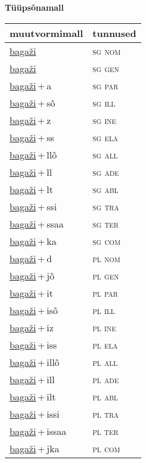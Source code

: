 
\vspace{1.8em}
\begin{minipage}{\textwidth}
\textbf{Tüüpsõnamall \,}\\

\begin{sideways}
\begin{tabular}{l l}
muutvormimall & tunnused \\
\hline
\underline{bagaži} & \textsc{ sg nom } \\
\underline{bagaži} & \textsc{ sg gen } \\
\underline{bagaži}\,+\,a & \textsc{ sg par } \\
\underline{bagaži}\,+\,sõ & \textsc{ sg ill } \\
\underline{bagaži}\,+\,z & \textsc{ sg ine } \\
\underline{bagaži}\,+\,ss & \textsc{ sg ela } \\
\underline{bagaži}\,+\,llõ & \textsc{ sg all } \\
\underline{bagaži}\,+\,ll & \textsc{ sg ade } \\
\underline{bagaži}\,+\,lt & \textsc{ sg abl } \\
\underline{bagaži}\,+\,ssi & \textsc{ sg tra } \\
\underline{bagaži}\,+\,ssaa & \textsc{ sg ter } \\
\underline{bagaži}\,+\,ka & \textsc{ sg com } \\
\underline{bagaži}\,+\,d & \textsc{ pl nom } \\
\underline{bagaži}\,+\,jõ & \textsc{ pl gen } \\
\underline{bagaži}\,+\,it & \textsc{ pl par } \\
\underline{bagaži}\,+\,isõ & \textsc{ pl ill } \\
\underline{bagaži}\,+\,iz & \textsc{ pl ine } \\
\underline{bagaži}\,+\,iss & \textsc{ pl ela } \\
\underline{bagaži}\,+\,illõ & \textsc{ pl all } \\
\underline{bagaži}\,+\,ill & \textsc{ pl ade } \\
\underline{bagaži}\,+\,ilt & \textsc{ pl abl } \\
\underline{bagaži}\,+\,issi & \textsc{ pl tra } \\
\underline{bagaži}\,+\,issaa & \textsc{ pl ter } \\
\underline{bagaži}\,+\,jka & \textsc{ pl com } \\
\end{tabular}
\end{sideways}
\label{tab:tüüpsõnamall-bagaži}

\end{minipage}

